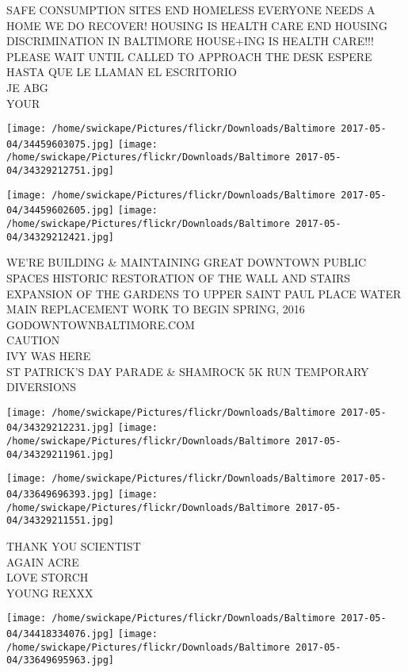 \documentclass[10pt,letterpaper]{article}
\begin{document}
SAFE CONSUMPTION SITES END HOMELESS EVERYONE NEEDS A HOME WE DO RECOVER!  HOUSING IS HEALTH CARE END HOUSING DISCRIMINATION IN BALTIMORE HOUSE+ING IS HEALTH CARE!!!\\
PLEASE WAIT UNTIL CALLED TO APPROACH THE DESK ESPERE HASTA QUE LE LLAMAN EL ESCRITORIO\\
JE ABG\\
YOUR\\
\pagebreak

\texttt{[image: /home/swickape/Pictures/flickr/Downloads/Baltimore 2017-05-04/34459603075.jpg]}
\texttt{[image: /home/swickape/Pictures/flickr/Downloads/Baltimore 2017-05-04/34329212751.jpg]}

\texttt{[image: /home/swickape/Pictures/flickr/Downloads/Baltimore 2017-05-04/34459602605.jpg]}
\texttt{[image: /home/swickape/Pictures/flickr/Downloads/Baltimore 2017-05-04/34329212421.jpg]}

WE'RE BUILDING \& MAINTAINING GREAT DOWNTOWN PUBLIC SPACES HISTORIC RESTORATION OF THE WALL AND STAIRS EXPANSION OF THE GARDENS TO UPPER SAINT PAUL PLACE WATER MAIN REPLACEMENT WORK TO BEGIN SPRING, 2016 GODOWNTOWNBALTIMORE.COM\\
CAUTION\\
IVY WAS HERE\\
ST PATRICK'S DAY PARADE \& SHAMROCK 5K RUN TEMPORARY DIVERSIONS\\
\pagebreak

\texttt{[image: /home/swickape/Pictures/flickr/Downloads/Baltimore 2017-05-04/34329212231.jpg]}
\texttt{[image: /home/swickape/Pictures/flickr/Downloads/Baltimore 2017-05-04/34329211961.jpg]}

\texttt{[image: /home/swickape/Pictures/flickr/Downloads/Baltimore 2017-05-04/33649696393.jpg]}
\texttt{[image: /home/swickape/Pictures/flickr/Downloads/Baltimore 2017-05-04/34329211551.jpg]}

THANK YOU SCIENTIST\\
AGAIN ACRE\\
LOVE STORCH\\
YOUNG REXXX\\
\pagebreak

\texttt{[image: /home/swickape/Pictures/flickr/Downloads/Baltimore 2017-05-04/34418334076.jpg]}
\texttt{[image: /home/swickape/Pictures/flickr/Downloads/Baltimore 2017-05-04/33649695963.jpg]}
\end{document}
